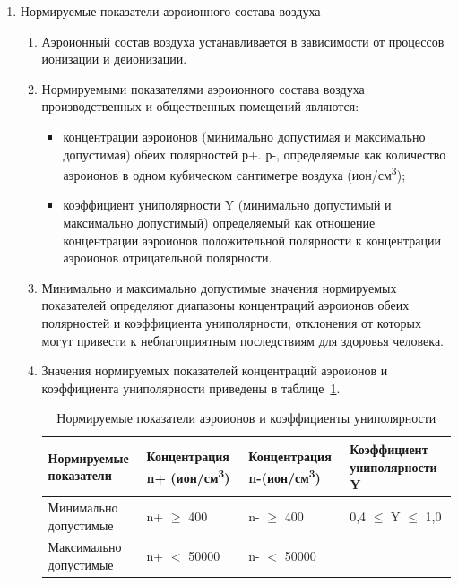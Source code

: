 \begin{enumerate}
\item Нормируемые показатели аэроионного состава воздуха
	\begin{enumerate}
	\item Аэроионный состав воздуха устанавливается в зависимости от процессов ионизации и деионизации.
	\item Нормируемыми показателями аэроионного состава воздуха производственных и общественных помещений являются:
		\begin{itemize}
			\item концентрации аэроионов (минимально допустимая и максимально допустимая) обеих полярностей р+. р-, определяемые как количество аэроионов в одном кубическом сантиметре воздуха (ион/см\textsuperscript{3});
			\item коэффициент униполярности Y (минимально допустимый и максимально допустимый) определяемый как отношение концентрации аэроионов положительной полярности к концентрации аэроионов отрицательной полярности.
		\end{itemize}
		\item Минимально и максимально допустимые значения нормируемых показателей определяют диапазоны концентраций аэроионов обеих полярностей и коэффициента униполярности, отклонения от которых могут привести к неблагоприятным последствиям для здоровья человека.
		\item Значения нормируемых показателей концентраций аэроионов и коэффициента униполярности приведены в таблице~\ref{bzd:aeroion}.

\begin{table}[!htb]
			\caption{Нормируемые показатели аэроионов и коэффициенты униполярности}\label{bzd:aeroion}
		    \centering
			\begin{tabular}{|p{4cm}|p{3,5cm}|p{}|p{}|}
			\hline 
			Нормируемые показатели & 
			Концентрация n+ (ион/см\textsuperscript{3}) & 
			Концентрация n-(ион/см\textsuperscript{3}) & 
			Коэффициент униполярности Y\\ 
			\hline 
			Минимально допустимые & n+ $\geq$ 400 &  n- $\geq$ 400 &  0,4 $\leq$ Y $\leq$ 1,0\\ 
			\hline 
			Максимально допустимые & n+ $<$ 50000 & n- $<$ 50000 & ~\ \\ 
			\hline 
			\end{tabular} 
		    		
		\end{table}
		

\end{enumerate}
\end{enumerate}
